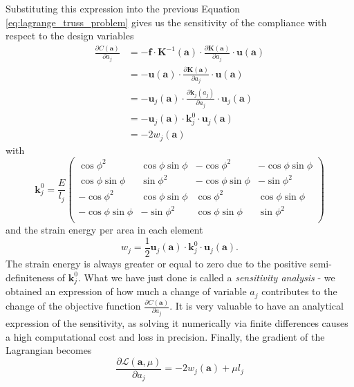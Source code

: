 Substituting this expression into the previous Equation \eqref{eq:lagrange_truss_problem} gives us the sensitivity of the compliance with respect to the design variables 
\begin{align}
    \frac{\partial C (\mathbf{a})}{\partial a_j} 
    &= - \mathbf{f} \cdot \mathbf{K}^{-1}(\mathbf{a}) \cdot \frac{\partial \mathbf{K} (\mathbf{a})}{\partial a_j} \cdot \mathbf{u} (\mathbf{a})  \\
    &= - \mathbf{u} (\mathbf{a}) \cdot \frac{\partial \mathbf{K} (\mathbf{a})}{\partial a_j} \cdot \mathbf{u} (\mathbf{a})  \\
    &= - \mathbf{u}_j (\mathbf{a}) \cdot \frac{\partial \mathbf{k}_j(a_j)}{\partial a_j} \cdot \mathbf{u}_j (\mathbf{a})  \\
    &= - \mathbf{u}_j (\mathbf{a}) \cdot \mathbf{k}^0_j \cdot \mathbf{u}_j (\mathbf{a})  \\
    &= - 2 w_j (\mathbf{a})
    \label{eq:compliance_sensitivity}
\end{align}
with 
\begin{equation}
    \mathbf{k}_j^0 = \frac{E}{l_j}
    \begin{pmatrix}
    \cos{\phi}^2 & \cos{\phi}\sin{\phi} & -\cos{\phi}^2 & -\cos{\phi}\sin{\phi} \\
    \cos{\phi}\sin{\phi} & \sin{\phi}^2 & -\cos{\phi}\sin{\phi} & -\sin{\phi}^2 \\
    -\cos{\phi}^2 & \cos{\phi}\sin{\phi} & \cos{\phi}^2 &\cos{\phi}\sin{\phi} \\
    -\cos{\phi}\sin{\phi} & -\sin{\phi}^2 & \cos{\phi}\sin{\phi} & \sin{\phi}^2 \\
    \end{pmatrix}
\end{equation}
and the strain energy per area in each element 
\begin{equation}
    w_j = \frac{1}{2} \mathbf{u}_j (\mathbf{a}) \cdot \mathbf{k}^0_j \cdot \mathbf{u}_j (\mathbf{a}).
    \label{eq:element_strain_energy}
\end{equation}
The strain energy is always greater or equal to zero due to the positive semi-definiteness of $\mathbf{k}^0_j$.
What we have just done is called a \emph{sensitivity analysis} - we obtained an expression of how much a change of variable $a_j$ contributes to the change of the objective function $\frac{\partial C (\mathbf{a})}{\partial a_j}$. It is very valuable to have an analytical expression of the sensitivity, as solving it numerically via finite differences causes a high computational cost and loss in precision.
Finally, the gradient of the Lagrangian becomes 
\begin{equation}
    \frac{\partial \mathcal{L} (\mathbf{a}, \mu)}{\partial a_j} 
    = - 2 w_j (\mathbf{a}) + \mu l_j
    \label{eq:lagrange_sensitivity}
\end{equation}

